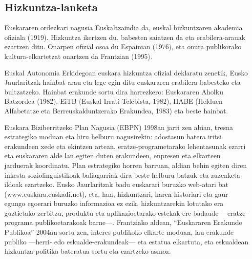 \begin{multicols}{2}
\subsection{Hizkuntza-lanketa}
    Euskararen ordezkari nagusia Euskaltzaindia da, euskal hizkuntzaren akademia ofiziala (1919). Hizkuntza ikertzen du, babesten saiatzen da eta erabilera-arauak ezartzen ditu. Onarpen ofizial osoa du Espainian (1976), eta onura publikorako kultura-elkartetzat onartzen da Frantzian (1995). 

Euskal Autonomia Erkidegoan euskara hizkuntza ofizial deklaratu zenetik, Eusko Jaurlaritzak hainbat arau eta lege egin ditu euskararen erabilera babesteko eta bultzatzeko. Hainbat erakunde sortu dira harrezkero: Euskararen Aholku Batzordea (1982), EiTB (Euskal Irrati Telebista, 1982), HABE (Helduen Alfabetatze eta Berreuskalduntzerako Erakundea, 1983) eta beste hainbat. 

Euskara Biziberritzeko Plan Nagusia (EBPN) 1998an jarri zen abian, tresna estrategiko moduan eta hiru helburu nagusirekin: adostasun batera iritsi erakundeen xede eta ekintzen artean, eratze-programetarako lehentasunak ezarri eta euskararen alde lan egiten duten erakundeen, enpresen eta elkarteen jarduerak koordinatu. Plan estrategiko horren barruan, aldian behin egiten diren inkesta soziolinguistikoak baliagarriak dira beste helburu batzuk eta zuzenketa-ildoak ezartzeko. Eusko Jaurlaritzak badu euskarari buruzko web-atari bat (www.euskara.euskadi.net), eta, han, hizkuntzari, haren historiari eta gaur egungo egoerari buruzko informazioa ez ezik, hizkuntzarekin lotutako era guztietako zerbitzu, produktu eta aplikazioetarako estekak ere badaude —eratze-programa publikoetarakoak barne—. Frantziako aldean, “Euskararen Erakunde Publikoa” \cite{BAS-Nota11}  2004an sortu zen, interes publikoko elkarte moduan, lau erakunde publiko —herri- edo eskualde-erakundeak— eta estatua elkartuta, eta eskualdean hizkuntza-politika bateratua sortu eta ezartzeko asmoz.


\end{multicols}

